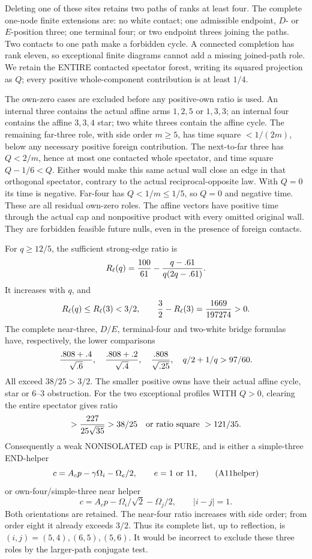 Deleting one of these sites retains two paths
of ranks at least four.
The complete one-node finite extensions are:
no white contact; one admissible endpoint,
\(D\)- or \(E\)-position three; one terminal
four; or two endpoint threes joining the paths.
Two contacts to one path make a forbidden
cycle.  A connected completion has rank eleven,
so exceptional finite diagrams cannot add a
missing joined-path role.
We retain the ENTIRE contacted spectator forest,
writing its squared projection as \(Q\);
every positive whole-component contribution
is at least \(1/4\).

The own-zero cases are excluded before any
positive-own ratio is used.
An internal three contains the actual affine
arms \(1,2,5\) or \(1,3,3\); an internal four
contains the affine \(3,3,4\) star; two
white threes contain the affine cycle.
The remaining far-three role, with side
order \(m\ge5\), has time square
\(<1/(2m)\), below any necessary positive
foreign contribution.
The next-to-far three has \(Q<2/m\), hence
at most one contacted whole spectator, and
time square \(Q-1/6<Q\).
Either would make this same actual wall
close an edge in that orthogonal spectator,
contrary to the actual reciprocal-opposite
law.  With \(Q=0\) its time is negative.
Far-four has \(Q<1/m\le1/5\), so \(Q=0\)
and negative time.
These are all residual own-zero roles.
The affine vectors have positive time through
the actual cap and nonpositive product with
every omitted original wall.
They are forbidden feasible future nulls,
even in the presence of foreign contacts.

For \(q\ge12/5\), the sufficient strong-edge
ratio is
\[
 R_\ell(q)={100\over61}
              -{q-.61\over q(2q-.61)}.
\]
It increases with \(q\), and
\[
 R_\ell(q)\le R_\ell(3)<3/2,\qquad
 {3\over2}-R_\ell(3)={1669\over197274}>0.
\]
The complete near-three, \(D/E\), terminal-four
and two-white bridge formulas have, respectively,
the lower comparisons
\[
 { .808+.4\over\sqrt{.6}},\quad
 { .808+.2\over\sqrt{.4}},\quad
 { .808\over\sqrt{.25}},\quad
 q/2+1/q>97/60 .
\]
All exceed \(38/25>3/2\).
The smaller positive owns have their actual
affine cycle, star or \(6\)--\(3\) obstruction.
For the two exceptional profiles WITH \(Q>0\),
clearing the entire spectator gives ratio
\[
 >{227\over25\sqrt{35}}>38/25
       \quad\hbox{or ratio square }>121/35.
\]
Consequently a weak NONISOLATED cap is PURE,
and is either a simple-three END-helper
\[
 c=A_cp-\gamma\Omega_i-\Omega_e/2,\qquad
 e=1\ \hbox{or }11,
\tag{A11helper}\label{eq:arithA11helper}
\]
or own-four/simple-three near helper
\[
 c=A_cp-\Omega_i/\sqrt2-\Omega_j/2,\qquad |i-j|=1.
\tag{A11near4}\label{eq:arithA11near4}
\]
Both orientations are retained.
The near-four ratio increases with side order;
from order eight it already exceeds \(3/2\).
Thus its complete list, up to reflection, is
\((i,j)=(5,4),(6,5),(5,6)\).
It would be incorrect to exclude these three
roles by the larger-path conjugate test.

